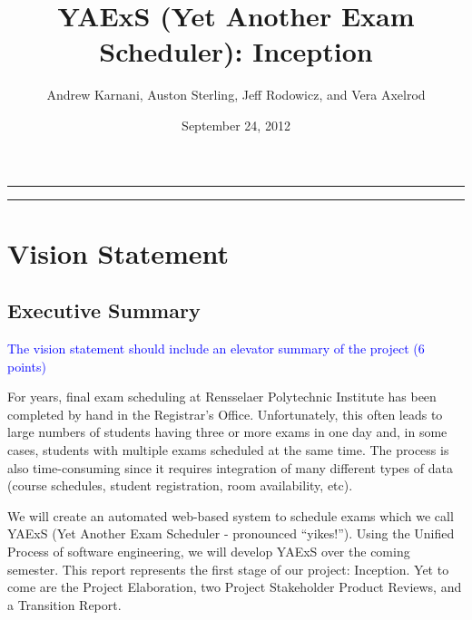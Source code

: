 \documentclass[11pt]{article}
\author{Andrew Karnani, Auston Sterling, Jeff Rodowicz, and Vera Axelrod}
\title{YAExS {(Yet Another Exam Scheduler)}: Inception}
\date{September 24, 2012}
\begin{document}
\maketitle
\vspace{-0.1in}
\hrule

\tableofcontents %

\vspace{0.3in}
\hrule

\section{Vision Statement}
\subsection{Executive Summary} %
\textcolor{blue}{The vision statement should include an elevator summary of the project (6 points)}

For years, final exam scheduling at Rensselaer Polytechnic Institute has been
 completed by hand in the Registrar’s Office. 
Unfortunately, this often leads to large numbers of students having three or more
 exams in one day and, in some cases, students with multiple exams scheduled at
 the same time.  
 The process is also time-consuming since it requires integration of many different
 types of data (course schedules, student registration, room availability, etc). 

We will create an automated web-based system to schedule exams which we call YAExS 
(Yet Another Exam Scheduler - pronounced “yikes!”).
Using the Unified Process of software engineering, we will develop YAExS
 over the coming semester. 
This report represents the first stage of our project: Inception. 
Yet to come are the Project Elaboration, two Project Stakeholder Product Reviews,
 and a Transition Report.

\begin{comment}
This system will integrate all the data necessary to schedule exams and create a
excellent exam schedule.  
The entire system will be customizable, easy to use, and flexible
 so that the exam schedule can be changed to satisfy last-minute requirements.
\end{comment}
\end{document}
